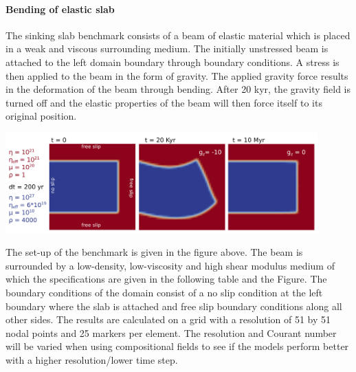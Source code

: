 \paragraph{Bending of elastic slab}

The sinking slab benchmark consists of a beam of elastic material which is placed 
in a weak and viscous surrounding medium. The initially unstressed beam is attached 
to the left domain boundary through boundary conditions. A stress is then applied to 
the beam in the form of gravity. The applied gravity force results in the deformation 
of the beam through bending. After 20 kyr, the gravity field is turned off and the 
elastic properties of the beam will then force itself to its original position.  

\begin{center}
\includegraphics[width=0.9\textwidth]{python_codes/fieldstone_64/images/poster_benchmark.png}\\
\end{center}


The set-up of the benchmark is given in the figure above. 
The beam is surrounded by a low-density, low-viscosity and high shear modulus medium 
of which the specifications are given in  the following table and the Figure. 
The boundary conditions of the domain consist of a no slip condition at 
the left boundary where the slab is attached and free slip boundary conditions along all other sides. 
The results are calculated on a grid with a resolution of 51 by 51 nodal points 
and 25 markers per element. 
The resolution and Courant number will be varied when using compositional fields to see 
if the models perform better with a higher resolution/lower time step. 

